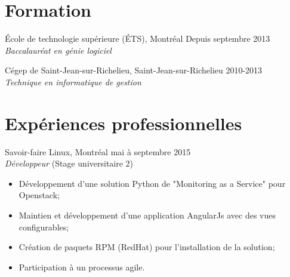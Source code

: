 \documentclass{res}
\newcommand{\inFrench}[1]{#1}
\newcommand{\inEnglish}[1]{}
\begin{document}
\begin{resume}
\section{Formation}
\vspace{6pt}

\inFrench{
	École de technologie supérieure (ÉTS), Montréal
	\hfill Depuis septembre 2013 \\
	{\sl Baccalauréat en génie logiciel}

	Cégep de Saint-Jean-sur-Richelieu, Saint-Jean-sur-Richelieu
	\hfill 2010-2013 \\
	{\sl Technique en informatique de gestion}
}
\inEnglish{
	École de technologie supérieure (ÉTS), Montreal
	\hfill Since September 2013 \\
	{\sl Bachelor in Software Engineering}

	Cegep of Saint-Jean-sur-Richelieu, Saint-Jean-sur-Richelieu
	\hfill 2010-2013 \\
	{\sl Technique en informatique de gestion}
}


\inFrench{
	\section{Expériences professionnelles}
}
\inEnglish{
	\section{Professional experiences}
}
\vspace{6pt}

\inFrench{
	Savoir-faire Linux, Montréal
	\hfill mai à septembre 2015 \\
	{\sl Développeur} \hfill (Stage universitaire 2)
	\vspace{0.05in}

	\begin{itemize} \itemsep -2pt
		\item Développement d'une solution Python de "Monitoring as a Service" pour Openstack;
		\item Maintien et développement d'une application AngularJs avec des vues configurables;
		\item Création de paquets RPM (RedHat) pour l'installation de la solution;
		\item Participation à un processus agile.
	\end{itemize}

}
\end{resume}
\end{document}

